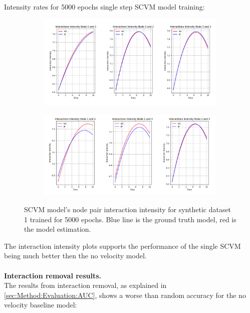 \noindent
Intensity rates for 5000 epochs single step SCVM model training:
\begin{figure}[H]
    \centering
    \begin{subfigure}[b]{\textwidth}
        \centering
        \includegraphics[width=\textwidth]{0_images/rq1_SCVM_intensity_plot1.png}
    \end{subfigure}
    \vfill
    \begin{subfigure}[b]{\textwidth}
        \centering
        \includegraphics[width=\textwidth]{0_images/rq1_SCVM_intensity_plot2.png}
    \end{subfigure}
    \caption{SCVM model's node pair interaction intensity for synthetic dataset 1 trained for 5000 epochs. Blue line is the ground truth model, red is the model estimation.}
    \label{fig:RQ1:SCVM_intensity}
\end{figure}
\noindent
The interaction intensity plots supports the performance of the single SCVM being much better then the no velocity model.
\\\\
\textbf{Interaction removal results.}
\\
The results from interaction removal, as explained in \ref{sec:Method:Evaluation:AUC}, shows a worse than random accuracy for the no velocity baseline model:
